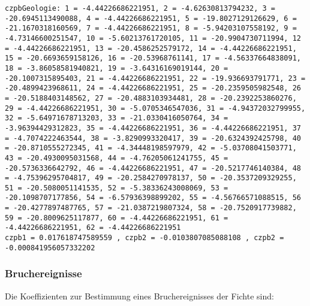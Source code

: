\documentclass[twocolumn]{scrartcl}
\begin{document}
\texttt{czpbGeologie: 1 = -4.44226686221951, 2 = -4.62630813794232, 3 = -20.6945113490088, 4 = -4.44226686221951, 5 = -19.8027129126629, 6 = -21.1670318160569, 7 = -4.44226686221951, 8 = -5.94203107558192, 9 = -4.73146600251547, 10 = -5.60213761720105, 11 = -20.9904730711994, 12 = -4.44226686221951, 13 = -20.4586252579172, 14 = -4.44226686221951, 15 = -20.6693659158126, 16 = -20.53968761141, 17 = -4.56337664838091, 18 = -3.86058581940821, 19 = -3.64316169019144, 20 = -20.1007315895403, 21 = -4.44226686221951, 22 = -19.936693791771, 23 = -20.4899423968611, 24 = -4.44226686221951, 25 = -20.2359505982548, 26 = -20.5188403148562, 27 = -20.4883103934481, 28 = -20.2392253860276, 29 = -4.44226686221951, 30 = -5.0705346547036, 31 = -4.94372032799955, 32 = -5.64971678713203, 33 = -21.0330416050764, 34 = -3.96394429312823, 35 = -4.44226686221951, 36 = -4.44226686221951, 37 = -4.7074222463544, 38 = -3.8290993320417, 39 = -20.6324392425798, 40 = -20.8710555272345, 41 = -4.34448198597979, 42 = -5.03708041503771, 43 = -20.4930095031568, 44 = -4.76205061241755, 45 = -20.5736336642792, 46 = -4.44226686221951, 47 = -20.5217746140384, 48 = -4.75396295704817, 49 = -20.2584270978137, 50 = -20.3537209329255, 51 = -20.5080051141535, 52 = -5.38336243008069, 53 = -20.1098707177856, 54 = -6.57936398899202, 55 = -4.56766571088515, 56 = -20.4277897487765, 57 = -21.0387219807324, 58 = -20.7520917739882, 59 = -20.8009625117877, 60 = -4.44226686221951, 61 = -4.44226686221951, 62 = -4.44226686221951\\
  czpb1 = 0.017618747589559
  , czpb2 = -0.0103807085088108
  , czpb2 = -0.000841956057332202
}

\subsubsection{Bruchereignisse}

Die Koeffizienten zur Bestimmung eines Bruchereignisses der Fichte sind:
\end{document}
